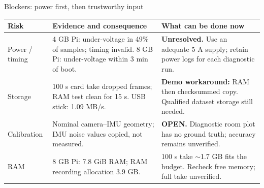 \begin{frame}{Blockers: power first, then trustworthy input}
{\small\begin{tabular}{@{}L{28mm}L{80mm}L{76mm}@{}}\toprule
\textbf{Risk} & \textbf{Evidence and consequence} & \textbf{What can be done now}\\\midrule
Power / timing & 4 GB Pi: under-voltage in 49\% of samples; timing invalid. 8 GB Pi: under-voltage within 3 min of boot. & \textbf{Unresolved.} Use an adequate 5 A supply; retain power logs for each diagnostic run.\\[5pt]
Storage & 100 s card take dropped frames; RAM test clean for 15 s. USB stick: 1.09 MB/s. & \textbf{Demo workaround:} RAM then checksummed copy. Qualified dataset storage still needed.\\[5pt]
Calibration & Nominal camera--IMU geometry; IMU noise values copied, not measured. & \textbf{OPEN.} Diagnostic room plot has no ground truth; accuracy remains unverified.\\[5pt]
RAM & 8 GB Pi: 7.8 GiB RAM; RAM recording allocation 3.9 GB. & 100 s take $\sim$1.7 GB fits the budget. Recheck free memory; full take unverified.\\\bottomrule
\end{tabular}}
\end{frame}

